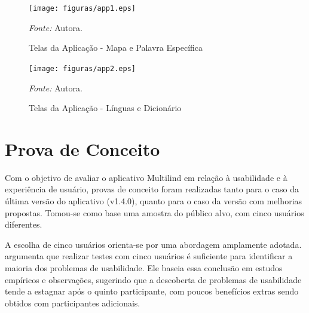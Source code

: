 \begin{figure}[h!]
	\centering
	\caption{Telas da Aplicação - Mapa e Palavra Específica}
	\begin{adjustbox}{center}
		\texttt{[image: figuras/app1.eps]}
	\end{adjustbox}
	\begin{tablenotes}[flushleft]
		\centering
		\item \textit{Fonte:} Autora.
	\end{tablenotes}
	\label{fig18}
\end{figure}

\newpage

\begin{figure}[h!]
	\centering
	\caption{Telas da Aplicação - Línguas e Dicionário}
	\begin{adjustbox}{center}
		\texttt{[image: figuras/app2.eps]}
	\end{adjustbox}
	\begin{tablenotes}[flushleft]
		\centering
		\item \textit{Fonte:} Autora.
	\end{tablenotes}
	\label{fig19}
\end{figure}


\section{Prova de Conceito}
\label{sec:Prova de Conceito}
Com o objetivo de avaliar o aplicativo Multilind em relação à usabilidade e à experiência de usuário, provas de conceito foram 
realizadas tanto para o caso da última versão do aplicativo (v1.4.0), quanto para o caso da versão com melhorias propostas. Tomou-se como base uma amostra do público alvo, com cinco 
usuários diferentes.

A escolha de cinco usuários orienta-se por uma abordagem amplamente adotada.  argumenta que realizar testes com cinco usuários é suficiente para identificar a maioria dos problemas de 
usabilidade. Ele baseia essa conclusão em estudos empíricos e observações, sugerindo que a descoberta de problemas de usabilidade tende a estagnar após o quinto participante, com poucos benefícios 
extras sendo obtidos com participantes adicionais.

